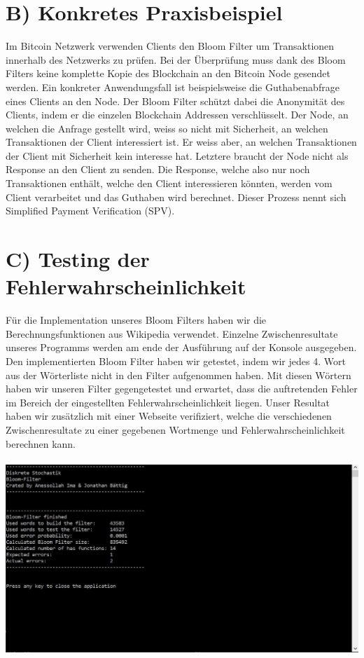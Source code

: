 \documentclass[a4paper, 11pt]{article}
\begin{document}
\section*{B) Konkretes Praxisbeispiel}
Im Bitcoin Netzwerk verwenden Clients den Bloom Filter um Transaktionen innerhalb des Netzwerks zu prüfen. Bei der Überprüfung muss dank des Bloom Filters keine komplette Kopie des Blockchain an den Bitcoin Node gesendet werden. Ein konkreter Anwendungsfall ist beispielsweise die Guthabenabfrage eines Clients an den Node. Der Bloom Filter schützt dabei die Anonymität des Clients, indem er die einzelen Blockchain Addressen verschlüsselt. Der Node, an welchen die Anfrage gestellt wird, weiss so nicht mit Sicherheit, an welchen Transaktionen der Client interessiert ist. Er weiss aber, an welchen Transaktionen der Client mit Sicherheit kein interesse hat. Letztere braucht der Node nicht als Response an den Client zu senden. Die Response, welche also nur noch Transaktionen enthält, welche den Client interessieren könnten, werden vom Client verarbeitet und das Guthaben wird berechnet. Dieser Prozess nennt sich Simplified Payment Verification (SPV).
\cite{TheMorpheusTutorials}
\newpage

\section*{C) Testing der Fehlerwahrscheinlichkeit}
Für die Implementation unseres Bloom Filters haben wir die Berechnungsfunktionen aus Wikipedia verwendet. Einzelne Zwischenresultate unseres Programms werden am ende der Ausführung auf der Konsole ausgegeben. Den implementierten Bloom Filter haben wir getestet, indem wir jedes 4. Wort aus der Wörterliste nicht in den Filter aufgenommen haben. Mit diesen Wörtern haben wir unseren Filter gegengetestet und erwartet, dass die auftretenden Fehler im Bereich der eingestellten Fehlerwahrscheinlichkeit liegen. Unser Resultat haben wir zusätzlich mit einer Webseite verifiziert, welche die verschiedenen Zwischenresultate zu einer gegebenen Wortmenge und Fehlerwahrscheinlichkeit berechnen kann.
\cite{Testsite} \\ \\
\includegraphics[width=\textwidth]{Program.jpg}
\end{document}
